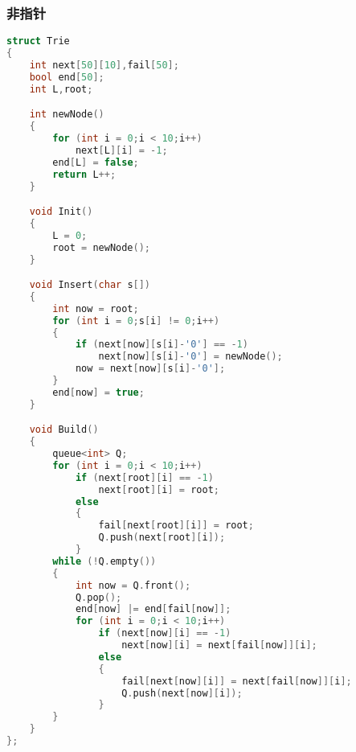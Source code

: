     \subsubsection{非指针}
        \begin{lstlisting}[language=c++]
struct Trie
{
    int next[50][10],fail[50];
    bool end[50];
    int L,root;

    int newNode()
    {
        for (int i = 0;i < 10;i++)
            next[L][i] = -1;
        end[L] = false;
        return L++;
    }

    void Init()
    {
        L = 0;
        root = newNode();
    }

    void Insert(char s[])
    {
        int now = root;
        for (int i = 0;s[i] != 0;i++)
        {
            if (next[now][s[i]-'0'] == -1)
                next[now][s[i]-'0'] = newNode();
            now = next[now][s[i]-'0'];
        }
        end[now] = true;
    }

    void Build()
    {
        queue<int> Q;
        for (int i = 0;i < 10;i++)
            if (next[root][i] == -1)
                next[root][i] = root;
            else
            {
                fail[next[root][i]] = root;
                Q.push(next[root][i]);
            }
        while (!Q.empty())
        {
            int now = Q.front();
            Q.pop();
            end[now] |= end[fail[now]];
            for (int i = 0;i < 10;i++)
                if (next[now][i] == -1)
                    next[now][i] = next[fail[now]][i];
                else
                {
                    fail[next[now][i]] = next[fail[now]][i];
                    Q.push(next[now][i]);
                }
        }
    }
};
        \end{lstlisting}